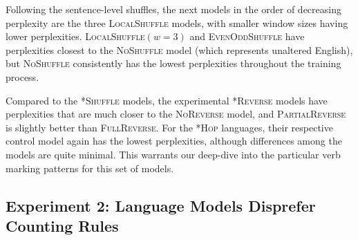 \documentclass[11pt]{article}
\newcommand{\singularmarker}{%
  \setlength{\fboxsep}{1pt}%
  \fbox{\texttt{S}}%
}
\newcommand{\pluralmarker}{%
  \setlength{\fboxsep}{1pt}%
  \fbox{\texttt{P}}%
}
\begin{document}
Following the sentence-level shuffles, the next models in the order of decreasing perplexity are the three \textsc{LocalShuffle} models, with smaller window sizes having lower perplexities. \textsc{LocalShuffle}$(w=3)$ and \textsc{EvenOddShuffle} have perplexities closest to the \textsc{NoShuffle} model (which represents unaltered English), but \textsc{NoShuffle} consistently has the lowest perplexities throughout the training process.

Compared to the \textsc{*Shuffle} models, the experimental \textsc{*Reverse} models have perplexities that are much closer to the \textsc{NoReverse} model, and \textsc{PartialReverse} is slightly better than \textsc{FullReverse}. For the \textsc{*Hop} languages, their respective control model again has the lowest perplexities, although differences among the models are quite minimal.
This warrants our deep-dive into the particular verb marking patterns for this set of models.

\subsection{Experiment 2: Language Models Disprefer Counting Rules} \label{sec:surprisals}

\end{document}
